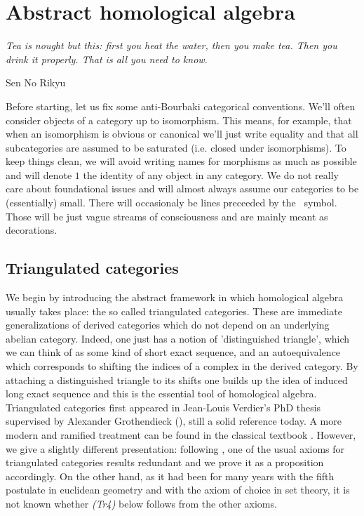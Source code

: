 \section{Abstract homological algebra}
\epigraph{\textit{Tea is nought but this: first you heat the water, then you make tea. Then you drink it properly. That is all you need to know.}}{Sen No Rikyu}
\vspace{10 mm}
Before starting, let us fix some anti-Bourbaki categorical conventions. We'll often consider objects of a category up to isomorphism. This means, for example, that when an isomorphism is obvious or canonical we'll just write equality and that all subcategories are assumed to be saturated (i.e. closed under isomorphisms). To keep things clean, we will avoid writing names for morphisms as much as possible and will denote $1$ the identity of any object in any category. We do not really care about foundational issues and will almost always assume our categories to be (essentially) small. There will occasionaly be lines preceeded by the \twonotes \ symbol. Those will be just vague streams of consciousness and are mainly meant as decorations. \\

\subsection{Triangulated categories}
We begin by introducing the abstract framework in which homological algebra usually takes place: the so called triangulated categories. These are immediate generalizations of derived categories which do not depend on an underlying abelian category. Indeed, one just has a notion of 'distinguished triangle', which we can think of as some kind of short exact sequence, and an autoequivalence which corresponds to shifting the indices of a complex in the derived category. By attaching a distinguished triangle to its shifts one builds up the idea of induced long exact sequence and this is the essential tool of homological algebra. \\

Triangulated categories first appeared in Jean-Louis Verdier's PhD thesis supervised by Alexander Grothendieck (\cite{ver}), still a solid reference today. A more modern and ramified treatment can be found in the classical textbook \cite{gel}. However, we give a slightly different presentation: following \cite{may}, one of the usual axioms for triangulated categories results redundant and we prove it as a proposition accordingly. On the other hand, as it had been for many years with the fifth postulate in euclidean geometry and with the axiom of choice in set theory, it is not known whether \textit{(Tr4)} below follows from the other axioms. 

